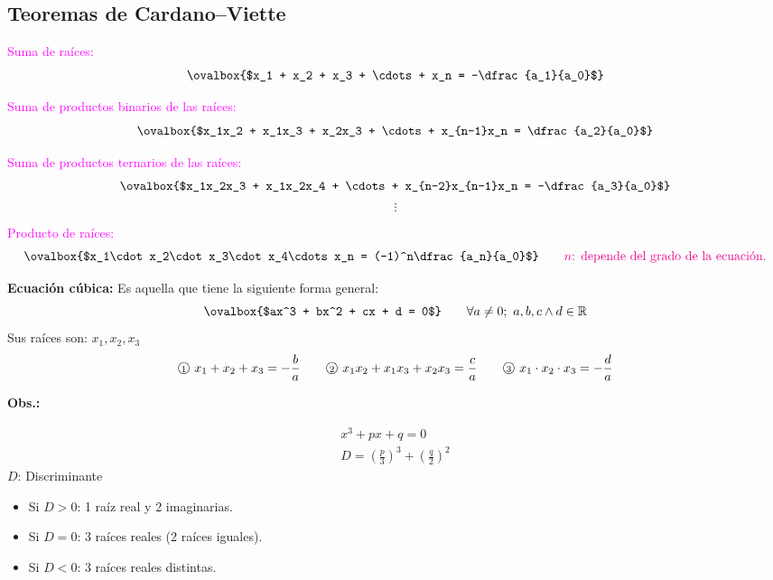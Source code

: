 \documentclass[11pt,a4paper]{article}
\newcommand{\cn}[1]{\raisebox{.5pt}{\textcircled{\raisebox{-.9pt}{\scriptsize #1}}}}
\begin{document}
\subsection*{Teoremas de Cardano--Viette}

\begin{minipage}[t]{0.436\textwidth}
\cn{1} \textcolor{magenta}{Suma de raíces:}
\[\ovalbox{$x_1 + x_2 + x_3 + \cdots + x_n = -\dfrac{a_1}{a_0}$}\]
\end{minipage}\hfill
\begin{minipage}[t]{0.533\textwidth}
\cn{2} \textcolor{magenta}{Suma de productos binarios de las raíces:}
\[\ovalbox{$x_1x_2 + x_1x_3 + x_2x_3 + \cdots + x_{n-1}x_n = \dfrac{a_2}{a_0}$}\]
\end{minipage}

\medskip
\begin{minipage}[t]{0.582\textwidth}
\cn{3} \textcolor{magenta}{Suma de productos ternarios de las raíces:}
\[\ovalbox{$x_1x_2x_3 + x_1x_2x_4 + \cdots + x_{n-2}x_{n-1}x_n = -\dfrac{a_3}{a_0}$}\]
\[\vdots\]
\end{minipage}\hfill
\begin{minipage}[t]{0.388\textwidth}
\end{minipage}

\cn{4} \textcolor{magenta}{Producto de raíces:}
\[\ovalbox{$x_1\cdot x_2\cdot x_3\cdot x_4\cdots x_n = (-1)^n\dfrac{a_n}{a_0}$} \qquad
\textcolor{magenta}{n\text{: depende del grado de la ecuación.}}\]

\textcolor{naranja}{\textbf{Ecuación cúbica:}} Es aquella que tiene la siguiente forma general:
\[\ovalbox{$ax^3 + bx^2 + cx + d = 0$} \qquad \forall a \neq 0;\ a, b, c \wedge d \in \mathbb{R}\]
Sus raíces son: $x_1, x_2, x_3$
\[
\cn{1}\ x_1 + x_2 + x_3 = -\frac{b}{a} \qquad
\cn{2}\ x_1x_2 + x_1x_3 + x_2x_3 = \frac{c}{a} \qquad
\cn{3}\ x_1\cdot x_2\cdot x_3 = -\frac{d}{a}
\]

\textcolor{verde}{\textbf{Obs.:}}

\begin{minipage}{0.388\textwidth}
\begin{gather*}
x^3 + px + q = 0\\
D = \left(\frac{p}{3}\right)^3 + \left(\frac{q}{2}\right)^2
\end{gather*}
\textcolor{rojo}{$D$}: Discriminante
\end{minipage}\hfill
\begin{minipage}{0.582\textwidth}
\begin{itemize}[label=\checkmark]
  \item Si $D > 0$: 1 raíz real y 2 imaginarias.
  \item Si $D = 0$: 3 raíces reales (2 raíces iguales).
  \item Si $D < 0$: 3 raíces reales distintas.
\end{itemize}
\end{minipage}
\end{document}
